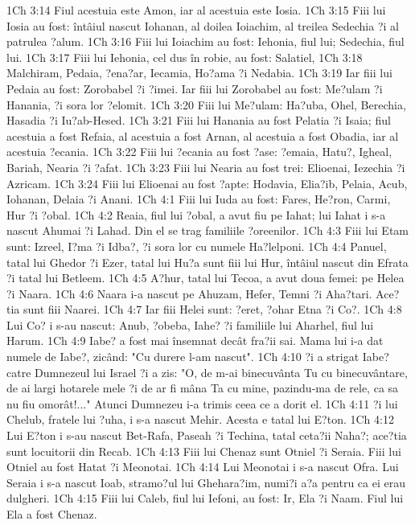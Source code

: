 1Ch 3:14  Fiul acestuia este Amon, iar al acestuia este Iosia.
1Ch 3:15  Fiii lui Iosia au fost: întâiul nascut Iohanan, al doilea Ioiachim, al treilea Sedechia ?i al patrulea ?alum.
1Ch 3:16  Fiii lui Ioiachim au fost: Iehonia, fiul lui; Sedechia, fiul lui.
1Ch 3:17  Fiii lui Iehonia, cel dus în robie, au fost: Salatiel,
1Ch 3:18  Malchiram, Pedaia, ?ena?ar, Iecamia, Ho?ama ?i Nedabia.
1Ch 3:19  Iar fiii lui Pedaia au fost: Zorobabel ?i ?imei. Iar fiii lui Zorobabel au fost: Me?ulam ?i Hanania, ?i sora lor ?elomit.
1Ch 3:20  Fiii lui Me?ulam: Ha?uba, Ohel, Berechia, Hasadia ?i Iu?ab-Hesed.
1Ch 3:21  Fiii lui Hanania au fost Pelatia ?i Isaia; fiul acestuia a fost Refaia, al acestuia a fost Arnan, al acestuia a fost Obadia, iar al acestuia ?ecania.
1Ch 3:22  Fiii lui ?ecania au fost ?ase: ?emaia, Hatu?, Igheal, Bariah, Nearia ?i ?afat.
1Ch 3:23  Fiii lui Nearia au fost trei: Elioenai, Iezechia ?i Azricam.
1Ch 3:24  Fiii lui Elioenai au fost ?apte: Hodavia, Elia?ib, Pelaia, Acub, Iohanan, Delaia ?i Anani.
1Ch 4:1  Fiii lui Iuda au fost: Fares, He?ron, Carmi, Hur ?i ?obal.
1Ch 4:2  Reaia, fiul lui ?obal, a avut fiu pe Iahat; lui Iahat i s-a nascut Ahumai ?i Lahad. Din el se trag familiile ?oreenilor.
1Ch 4:3  Fiii lui Etam sunt: Izreel, I?ma ?i Idba?, ?i sora lor cu numele Ha?lelponi.
1Ch 4:4  Panuel, tatal lui Ghedor ?i Ezer, tatal lui Hu?a sunt fiii lui Hur, întâiul nascut din Efrata ?i tatal lui Betleem.
1Ch 4:5  A?hur, tatal lui Tecoa, a avut doua femei: pe Helea ?i Naara.
1Ch 4:6  Naara i-a nascut pe Ahuzam, Hefer, Temni ?i Aha?tari. Ace?tia sunt fiii Naarei.
1Ch 4:7  Iar fiii Helei sunt: ?eret, ?ohar Etna ?i Co?.
1Ch 4:8  Lui Co? i s-au nascut: Anub, ?obeba, Iahe? ?i familiile lui Aharhel, fiul lui Harum.
1Ch 4:9  Iabe? a fost mai însemnat decât fra?ii sai. Mama lui i-a dat numele de Iabe?, zicând: "Cu durere l-am nascut".
1Ch 4:10  ?i a strigat Iabe? catre Dumnezeul lui Israel ?i a zis: "O, de m-ai binecuvânta Tu cu binecuvântare, de ai largi hotarele mele ?i de ar fi mâna Ta cu mine, pazindu-ma de rele, ca sa nu fiu omorât!..." Atunci Dumnezeu i-a trimis ceea ce a dorit el.
1Ch 4:11  ?i lui Chelub, fratele lui ?uha, i s-a nascut Mehir. Acesta e tatal lui E?ton.
1Ch 4:12  Lui E?ton i s-au nascut Bet-Rafa, Paseah ?i Techina, tatal ceta?ii Naha?; ace?tia sunt locuitorii din Recab.
1Ch 4:13  Fiii lui Chenaz sunt Otniel ?i Seraia. Fiii lui Otniel au fost Hatat ?i Meonotai.
1Ch 4:14  Lui Meonotai i s-a nascut Ofra. Lui Seraia i s-a nascut Ioab, stramo?ul lui Ghehara?im, numi?i a?a pentru ca ei erau dulgheri.
1Ch 4:15  Fiii lui Caleb, fiul lui Iefoni, au fost: Ir, Ela ?i Naam. Fiul lui Ela a fost Chenaz.
